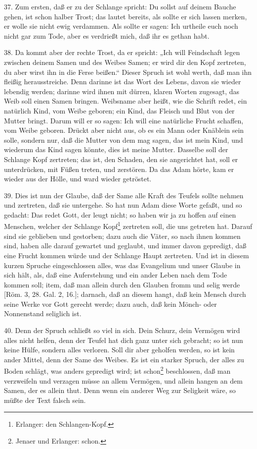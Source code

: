37. Zum ersten, daß er zu der Schlange spricht: Du sollst auf deinem Bauche gehen, ist schon halber Trost; das lautet bereits, als sollte er sich lassen merken, er wolle sie nicht ewig verdammen. Als sollte er sagen: Ich urtheile euch noch
nicht gar zum Tode, aber es verdrießt mich, daß ihr es gethan habt.

38. Da kommt aber der rechte Trost, da er spricht: „Ich will Feindschaft legen zwischen deinem Samen und des Weibes Samen; er wird dir den Kopf zertreten, du aber wirst ihn in die Ferse beißen.“ Dieser Spruch ist wohl werth, daß man ihn fleißig herausstreiche. Denn darinne ist das Wort des Lebens, davon sie wieder lebendig werden; darinne wird ihnen mit dürren, klaren Worten zugesagt, das Weib soll einen Samen bringen. Weibsname aber heißt, wie die Schrift redet, ein natürlich Kind, vom Weibe geboren; ein Kind, das Fleisch und Blut von der Mutter bringt. Darum will er so sagen: Ich will eine natürliche Frucht schaffen, vom Weibe geboren. Drückt aber nicht aus, ob es ein Mann oder Knäblein sein solle, sondern nur, daß die Mutter von dem mag sagen, das ist mein Kind, und wiederum das Kind sagen könnte, dies ist meine Mutter. Dasselbe soll der Schlange Kopf zertreten; das ist, den Schaden, den sie angerichtet hat, soll er unterdrücken, mit Füßen treten, und zerstören. Da das Adam hörte, kam er wieder aus der Hölle, und ward wieder getröstet.

39. Dies ist nun der Glaube, daß der Same alle Kraft des Teufels sollte nehmen und zertreten, daß sie untergehe. So hat nun Adam diese Worte gefaßt, und so gedacht: Das redet Gott, der leugt nicht; so haben wir ja zu hoffen auf einen Menschen, welcher der Schlange Kopf\footnote{Erlanger: den Schlangen-Kopf.} zertreten soll, die uns getreten hat. Darauf sind sie geblieben und gestorben; dazu auch die Väter, so nach ihnen kommen sind, haben alle darauf gewartet und geglaubt, und immer davon gepredigt, daß eine Frucht kommen würde und der Schlange Haupt zertreten. Und ist in diesem kurzen Spruche eingeschlossen alles, was das Evangelium und unser Glaube in sich hält, als, daß eine Auferstehung und ein ander Leben nach dem Tode kommen soll; item, daß man allein durch den Glauben fromm und selig werde [Röm. 3, 28. Gal. 2, 16.]; darnach, daß an diesem hangt, daß kein Mensch durch seine Werke vor Gott gerecht werde; dazu auch, daß kein Mönch- oder Nonnenstand seliglich ist.

40. Denn der Spruch schließt so viel in sich. Dein Schurz, dein Vermögen wird alles nicht helfen, denn der Teufel hat dich ganz unter sich gebracht; so ist nun keine Hülfe, sondern alles verloren. Soll dir aber geholfen werden, so ist kein ander Mittel, denn der Same des Weibes. Es ist ein starker Spruch, der alles zu Boden schlägt, was anders gepredigt wird; ist schon\footnote{Jenaer und Erlanger: schon.} beschlossen, daß man verzweifeln und verzagen müsse an allem Vermögen, und allein hangen an dem Samen, der es allein thut. Denn wenn ein anderer Weg zur Seligkeit wäre, so müßte der Text falsch sein.

